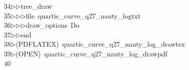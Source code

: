 \begin{tabbing}
34\>$\triangleright$\>$\triangleright$\>tree\_draw\ \\[0pt]
35\>$\triangleright$\>$\triangleright$\>$\triangleright$\>file\ quartic\_curve\_q27\_nauty\_logtxt\ \\[0pt]
36\>$\triangleright$\>$\triangleright$\>$\triangleright$\>draw\_options\ Do\ \\[0pt]
37\>$\triangleright$\>$\triangleright$\>end\\[0pt]
38\>$\triangleright$\>(PDFLATEX)\ quartic\_curve\_q27\_nauty\_log\_drawtex\\[0pt]
39\>$\triangleright$\>(OPEN)\ quartic\_curve\_q27\_nauty\_log\_drawpdf\\[0pt]
40\>\end{tabbing}
